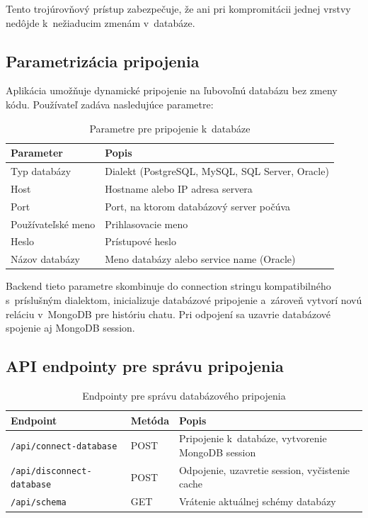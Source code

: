 \documentclass[a4paper, 12pt]{article}
\begin{document}
Tento trojúrovňový prístup zabezpečuje, že ani pri kompromitácii jednej vrstvy nedôjde k~nežiaducim zmenám v~databáze.

\subsection{Parametrizácia pripojenia}

Aplikácia umožňuje dynamické pripojenie na ľubovoľnú databázu bez zmeny kódu. Používateľ zadáva nasledujúce parametre:

\begin{table}[H]
\centering
\begin{tabular}{ll}
\toprule
\textbf{Parameter} & \textbf{Popis} \\
\midrule
Typ databázy & Dialekt (PostgreSQL, MySQL, SQL Server, Oracle) \\
Host & Hostname alebo IP adresa servera \\
Port & Port, na ktorom databázový server počúva \\
Používateľské meno & Prihlasovacie meno \\
Heslo & Prístupové heslo \\
Názov databázy & Meno databázy alebo service name (Oracle) \\
\bottomrule
\end{tabular}
\caption{Parametre pre pripojenie k~databáze}
\end{table}

Backend tieto parametre skombinuje do connection stringu kompatibilného s~príslušným dialektom, inicializuje databázové pripojenie a~zároveň vytvorí novú reláciu v~MongoDB pre históriu chatu. Pri odpojení sa uzavrie databázové spojenie aj MongoDB session.

\subsection{API endpointy pre správu pripojenia}

\begin{table}[H]
\centering
\begin{tabular}{llp{7cm}}
\toprule
\textbf{Endpoint} & \textbf{Metóda} & \textbf{Popis} \\
\midrule
\texttt{/api/connect-database} & POST & Pripojenie k~databáze, vytvorenie MongoDB session \\
\texttt{/api/disconnect-database} & POST & Odpojenie, uzavretie session, vyčistenie cache \\
\texttt{/api/schema} & GET & Vrátenie aktuálnej schémy databázy \\
\bottomrule
\end{tabular}
\caption{Endpointy pre správu databázového pripojenia}
\end{table}
\end{document}
